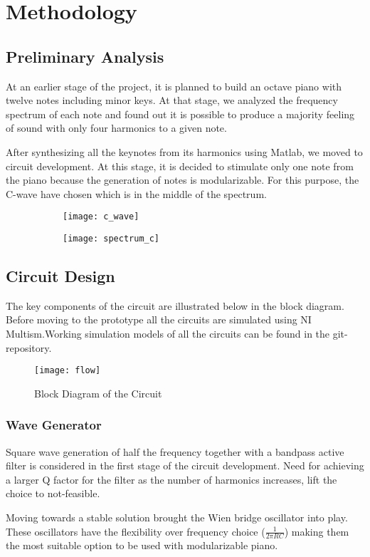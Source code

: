 \section{Methodology}
\subsection{Preliminary Analysis}
At an earlier stage of the project, it is planned to build an octave piano with twelve notes including minor keys. At that stage, we analyzed the frequency spectrum of each note and found out it is possible to produce a majority feeling of sound with only four harmonics to a given note.
\par
After synthesizing all the keynotes from its harmonics using Matlab, we moved to circuit development. At this stage, it is decided to stimulate only one note from the piano because the generation of notes is modularizable. For this purpose, the C-wave have chosen  which is in the middle of the spectrum.
\begin{figure}[h]
    \begin{subfigure}{.45\columnwidth}
        \centering
        \texttt{[image: c\_wave]}
    \end{subfigure}
    \begin{subfigure}{.45\columnwidth}
        \centering
        \texttt{[image: spectrum\_c]}
    \end{subfigure}

\end{figure}
\subsection{Circuit Design}
The key components of the circuit are illustrated below in the block diagram. Before moving to the prototype all the circuits are simulated using NI Multism.Working simulation models of all the circuits can be found in the git-repository.
\begin{figure}[h]
    \begin{center}
        \texttt{[image: flow]}
        \caption*{Block Diagram of the Circuit}
    \end{center}
\end{figure}
\subsubsection{Wave Generator}
Square wave generation of half the frequency together with a bandpass active filter is considered in the first stage of the circuit development. Need for achieving a larger Q factor for the filter as the number of harmonics increases, lift the choice to not-feasible.
\par
Moving towards a stable solution brought the Wien bridge oscillator into play. These oscillators have the flexibility over frequency choice ($\frac{1}{2\pi RC}$) making them the most suitable option to be used with modularizable piano.
